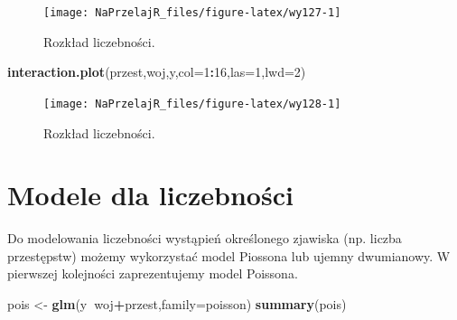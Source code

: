 \documentclass[polish,]{book}
\newenvironment{Shaded}{\begin{snugshade}}{\end{snugshade}}
\newcommand{\DataTypeTok}[1]{\textcolor[rgb]{0.13,0.29,0.53}{#1}}
\newcommand{\DecValTok}[1]{\textcolor[rgb]{0.00,0.00,0.81}{#1}}
\newcommand{\KeywordTok}[1]{\textcolor[rgb]{0.13,0.29,0.53}{\textbf{#1}}}
\newcommand{\NormalTok}[1]{#1}
\newcommand{\OperatorTok}[1]{\textcolor[rgb]{0.81,0.36,0.00}{\textbf{#1}}}
\newcommand{\StringTok}[1]{\textcolor[rgb]{0.31,0.60,0.02}{#1}}
\begin{document}
\begin{figure}[h]

{\centering \texttt{[image: NaPrzelajR\_files/figure-latex/wy127-1]} 

}

\caption{Rozkład liczebności.}\label{fig:wy127}
\end{figure}

\begin{Shaded}
\begin{Highlighting}[]
\KeywordTok{interaction.plot}\NormalTok{(przest,woj,y,}\DataTypeTok{col=}\DecValTok{1}\OperatorTok{:}\DecValTok{16}\NormalTok{,}\DataTypeTok{las=}\DecValTok{1}\NormalTok{,}\DataTypeTok{lwd=}\DecValTok{2}\NormalTok{)}
\end{Highlighting}
\end{Shaded}

\begin{figure}[h]

{\centering \texttt{[image: NaPrzelajR\_files/figure-latex/wy128-1]} 

}

\caption{Rozkład liczebności.}\label{fig:wy128}
\end{figure}

\hypertarget{part_12.4}{%
\section{Modele dla liczebności}\label{part_12.4}}

Do modelowania liczebności wystąpień określonego zjawiska (np. liczba przestępstw)
możemy wykorzystać model Piossona lub ujemny dwumianowy. W pierwszej kolejności zaprezentujemy model Poissona.

\begin{Shaded}
\begin{Highlighting}[]
\NormalTok{pois <-}\StringTok{ }\KeywordTok{glm}\NormalTok{(y}\OperatorTok{~}\NormalTok{woj}\OperatorTok{+}\NormalTok{przest,}\DataTypeTok{family=}\NormalTok{poisson)}
\KeywordTok{summary}\NormalTok{(pois)}
\end{Highlighting}
\end{Shaded}
\end{document}
